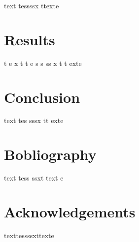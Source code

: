 \documentclass[
  ams,
  uplatex]{U-AizuGT}
\begin{document}
    text tessssx ttexte

    \hypertarget{results}{%
    \section{Results}\label{results}}

    t e x t t e s s ss x t t exte

    \hypertarget{conclusion}{%
    \section{Conclusion}\label{conclusion}}

    text tes sssx tt exte

    \hypertarget{bobliography}{%
    \section{Bobliography}\label{bobliography}}

    text tess ssxt text e

    \hypertarget{acknowledgements}{%
    \section{Acknowledgements}\label{acknowledgements}}

    texttessssxttexte

        
\end{document}
